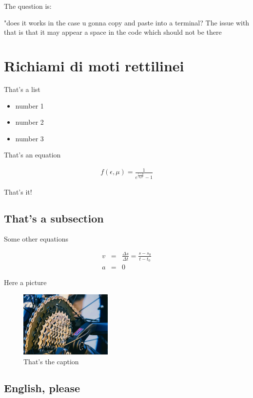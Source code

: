 \documentclass[17pt]{extarticle}
\begin{document}
The question is:

"does it works in the case u gonna copy and paste into a terminal? The issue with that is that it may appear a space in the code which should not be there

\section{Richiami di moti rettilinei}

That's a list
\begin{itemize}
	\item number 1
	\item number 2
	\item number 3
\end{itemize}

That's an equation 

\begin{eqnarray}
	f(\epsilon, \mu) = \frac{1}{e^{\frac{\epsilon - \mu}{k_BT}}-1}
\end{eqnarray}

That's it!


\subsection{That's a subsection}\label{SPar:rettUn}

Some other equations

\begin{eqnarray}\label{eq:rettUniforme}
	v & = & \frac{\Delta s}{\Delta t} = \frac{s - s_0}{t - t_0}\\
	a & = & 0
\end{eqnarray}

Here a picture

\begin{figure}[h!]		
	\centering
   	\includegraphics[width=1.8in]{coppiaAlta.png}
  	\caption{That's the caption}
   	\label{fig:picture}
\end{figure}

\subsection{English, please}\label{SPar:unAcc}
\end{document}
